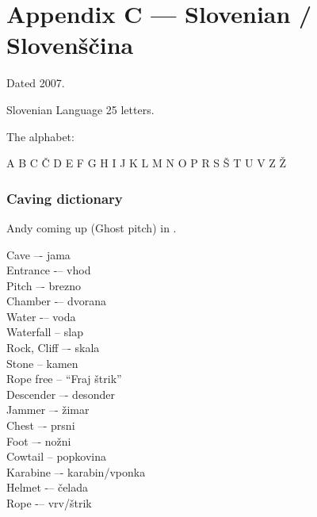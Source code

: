 \chapter{Appendix C --- Slovenian / Slovenščina}
Dated 2007.

Slovenian Language
25 letters.

The alphabet:

A B C Č D E F G H I J K L M N O P R S Š T U V Z Ž

\subsection{Caving dictionary}

\begin{marginfigure}
\checkoddpage \ifoddpage \forcerectofloat \else \forceversofloat \fi
\centering
 \caption{Andy coming up \protect{} (Ghost pitch) in \protect{}. }
 \label{brezno}
\end{marginfigure}

Cave –- jama\\
Entrance -– vhod\\
Pitch –- brezno\\
Chamber -– dvorana\\
Water -– voda\\
Waterfall -- slap\\
Rock, Cliff –- skala\\
Stone -- kamen\\
Rope free -- “Fraj štrik”\\
Descender –- desonder\\
Jammer –- žimar\\
Chest –- prsni\\
Foot –- nožni\\
Cowtail -- popkovina\\
Karabine –- karabin/vponka\\
Helmet -– čelada\\
Rope -– vrv/štrik\\


